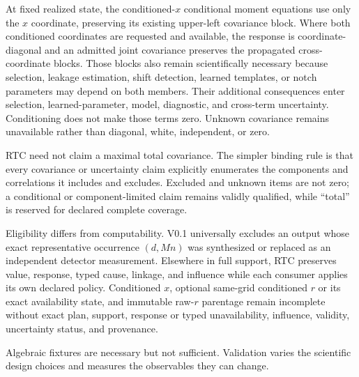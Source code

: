 \documentclass[10pt]{article}
\begin{document}
At fixed realized state, the conditioned-$x$ conditional moment equations use
only the $x$ coordinate, preserving its existing upper-left covariance block.
Where both conditioned coordinates are requested and available, the response
is coordinate-diagonal and an
admitted joint covariance preserves the propagated cross-coordinate blocks.
Those blocks also remain scientifically necessary because selection, leakage
estimation, shift detection, learned templates, or notch parameters may depend
on both members.  Their additional consequences enter selection,
learned-parameter, model, diagnostic, and cross-term uncertainty.
Conditioning does not make those terms zero.  Unknown covariance remains
unavailable rather than diagonal, white, independent, or zero.

RTC need not claim a maximal total covariance.  The simpler binding rule is
that every covariance or uncertainty claim explicitly enumerates the
components and correlations it includes and excludes.  Excluded and unknown
items are not zero; a conditional or component-limited claim remains validly
qualified, while ``total'' is reserved for declared complete coverage.

Eligibility differs from computability.  V0.1 universally excludes an output
whose exact representative occurrence $(d,Mn)$ was synthesized or replaced
as an independent detector measurement.  Elsewhere in full support, RTC
preserves value, response, typed cause, linkage, and influence while each
consumer applies its own declared policy.  Conditioned $x$, optional same-grid
conditioned $r$ or its exact availability state, and immutable raw-$r$
parentage remain incomplete without exact plan, support, response or typed
unavailability, influence, validity, uncertainty status, and provenance.

Algebraic fixtures are necessary but not sufficient. Validation varies the
scientific design choices and measures the observables they can change.
\end{document}
